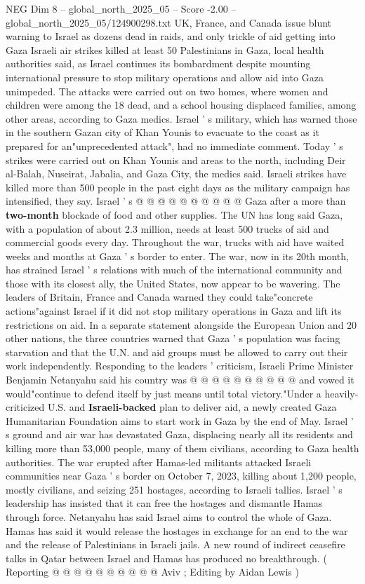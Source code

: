 \begin{textsample}{NEG Dim 8 – global\_north\_2025\_05 – Score -2.00 – global\_north\_2025\_05/124900298.txt}  \label{ex:f8_neg_059}
UK, France, and Canada issue blunt warning to Israel as dozens dead in raids, and only trickle of aid getting into Gaza Israeli air strikes killed at least 50 Palestinians in Gaza, local health authorities said, as Israel continues its bombardment despite mounting international pressure to stop military operations and allow aid into Gaza unimpeded.
The attacks were carried out on two homes, where women and children were among the 18 dead, and a school housing displaced families, among other areas, according to Gaza medics.
Israel ' s military, which has warned those in the southern Gazan city of Khan Younis to evacuate to the coast as it prepared for an"unprecedented attack", had no immediate comment.
Today ' s strikes were carried out on Khan Younis and areas to the north, including Deir al-Balah, Nuseirat, Jabalia, and Gaza City, the medics said.
Israeli strikes have killed more than 500 people in the past eight days as the military campaign has intensified, they say.
Israel ' s @ @ @ @ @ @ @ @ @ @ Gaza after a more than \textbf{two-month} blockade of food and other supplies.
The UN has long said Gaza, with a population of about 2.3 million, needs at least 500 trucks of aid and commercial goods every day.
Throughout the war, trucks with aid have waited weeks and months at Gaza ' s border to enter.
The war, now in its 20th month, has strained Israel ' s relations with much of the international community and those with its closest ally, the United States, now appear to be wavering.
The leaders of Britain, France and Canada warned they could take"concrete actions"against Israel if it did not stop military operations in Gaza and lift its restrictions on aid.
In a separate statement alongside the European Union and 20 other nations, the three countries warned that Gaza ' s population was facing starvation and that the U.N. and aid groups must be allowed to carry out their work independently.
Responding to the leaders ' criticism, Israeli Prime Minister Benjamin Netanyahu said his country was @ @ @ @ @ @ @ @ @ @ and vowed it would"continue to defend itself by just means until total victory."Under a heavily-criticized U.S. and \textbf{Israeli-backed} plan to deliver aid, a newly created Gaza Humanitarian Foundation aims to start work in Gaza by the end of May.
Israel ' s ground and air war has devastated Gaza, displacing nearly all its residents and killing more than 53,000 people, many of them civilians, according to Gaza health authorities.
The war erupted after Hamas-led militants attacked Israeli communities near Gaza ' s border on October 7, 2023, killing about 1,200 people, mostly civilians, and seizing 251 hostages, according to Israeli tallies.
Israel ' s leadership has insisted that it can free the hostages and dismantle Hamas through force.
Netanyahu has said Israel aims to control the whole of Gaza.
Hamas has said it would release the hostages in exchange for an end to the war and the release of Palestinians in Israeli jails.
A new round of indirect ceasefire talks in Qatar between Israel and Hamas has produced no breakthrough. ( Reporting @ @ @ @ @ @ @ @ @ @ Aviv ; Editing by Aidan Lewis )

\end{textsample}
